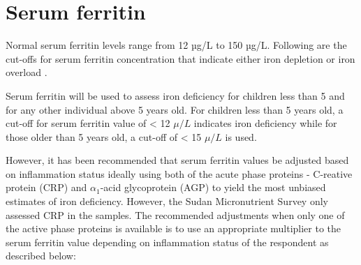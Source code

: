 \documentclass[12pt,a4paper]{article}
\begin{document}
\hypertarget{serum-ferritin}{%
\section{Serum ferritin}\label{serum-ferritin}}

Normal serum ferritin levels range from 12 µg/L to 150 µg/L. Following are the cut-offs for serum ferritin concentration that indicate either iron depletion or iron overload \citep{WorldHealthOrganization:2007tx, Gorstein:2007wn, Wegmuller:2020bw, WorldHealthOrganization:2011ue}.

\begin{table}[H]

\caption{\label{tab:ferritin}Relative extent of iron stores on the basis of serum ferritin concentration (µg/L)}
\centering
{}
\end{table}

Serum ferritin will be used to assess iron deficiency for children less than 5 and for any other individual above 5 years old. For children less than 5 years old, a cut-off for serum ferritin value of \textless{} 12 \(\mu/L\) indicates iron deficiency while for those older than 5 years old, a cut-off of \textless{} 15 \(\mu/L\) is used.

However, it has been recommended that serum ferritin values be adjusted based on inflammation status ideally using both of the acute phase proteins - C-reative protein (CRP) and \(\alpha_1\)-acid glycoprotein (AGP) to yield the most unbiased estimates of iron deficiency. However, the Sudan Micronutrient Survey only assessed CRP in the samples. The recommended adjustments when only one of the active phase proteins is available is to use an appropriate multiplier to the serum ferritin value depending on inflammation status of the respondent as described below:
\end{document}
